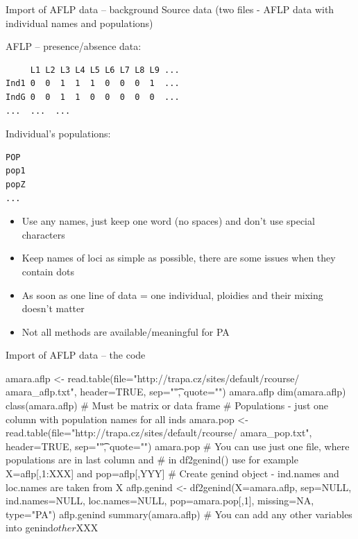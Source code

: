 \documentclass[compress, ucs, xelatex, 11pt, xcolor=svgnames,
  hyperref={
    bookmarks=true,
    unicode=true,
    colorlinks=true,
    pdftitle={Molecular data in R},
    plainpages=false,
    pdfauthor={Vojtech Zeisek},
    pdfsubject={Course about phylogeny and evolution in R},
    pdfcreator={XeLaTeX},
    pdfkeywords={R, evolution, phylogeny, molecular data},
    linkcolor=Tomato,
    anchorcolor=SaddleBrown,
    citecolor=Goldenrod,
    filecolor=DarkMagenta,
    menucolor=Sienna,
    urlcolor=DarkTurquoise,
    pdftex},
  url={hyphens, lowtilde} %
  ]{beamer}
\begin{document}
\begin{frame}[fragile]{Import of AFLP data -- background}
Source data (two files - AFLP data with individual names and populations)
\begin{multicols}{2}
AFLP -- presence/absence data:
\begin{verbatim}
     L1 L2 L3 L4 L5 L6 L7 L8 L9 ...
Ind1 0  0  1  1  1  0  0  0  1  ...
IndG 0  0  1  1  0  0  0  0  0  ...
...  ...  ...
\end{verbatim}
Individual's populations:
\begin{verbatim}
POP
pop1
popZ
...
\end{verbatim}
\columnbreak
\begin{itemize}
 \item Use any names, just keep one word (no spaces) and don't use special characters
 \item Keep names of loci as simple as possible, there are some issues when they contain dots
 \item As soon as one line of data = one individual, ploidies and their mixing doesn't matter
 \item Not all methods are available/meaningful for PA
\end{itemize}
\end{multicols}
\end{frame}

\begin{frame}[fragile]{Import of AFLP data -- the code}
  \begin{spluscode}
    amara.aflp <- read.table(file="http://trapa.cz/sites/default/rcourse/
      amara_aflp.txt", header=TRUE, sep="\t", quote="")
    amara.aflp
    dim(amara.aflp)
    class(amara.aflp) # Must be matrix or data frame
    # Populations - just one column with population names for all inds
    amara.pop <- read.table(file="http://trapa.cz/sites/default/rcourse/
      amara_pop.txt", header=TRUE, sep="\t", quote="")
    amara.pop
    # You can use just one file, where populations are in last column and
    # in df2genind() use for example X=aflp[,1:XXX] and pop=aflp[,YYY]
    # Create genind object - ind.names and loc.names are taken from X
    aflp.genind <- df2genind(X=amara.aflp, sep=NULL, ind.names=NULL,
      loc.names=NULL, pop=amara.pop[,1], missing=NA, type="PA")
    aflp.genind
    summary(amara.aflp)
    # You can add any other variables into genind$other$XXX
  \end{spluscode}
\end{frame}
\end{document}
